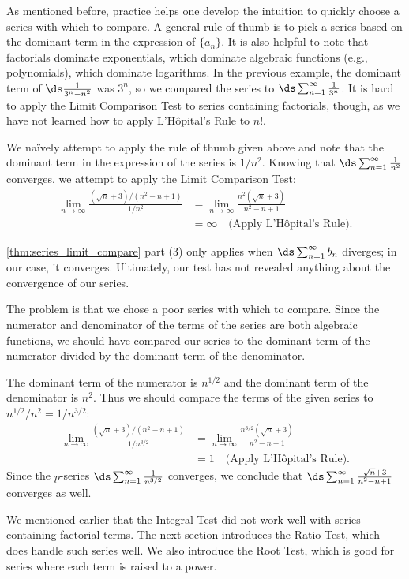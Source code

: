 As mentioned before, practice helps one develop the intuition to quickly choose a series with which to compare. A general rule of thumb is to pick a series based on the dominant term in the expression of $\{a_n\}$. It is also helpful to note that factorials dominate exponentials, which dominate algebraic functions (e.g., polynomials), which dominate logarithms. In the previous example, the dominant term of $\ds\frac{1}{3^n-n^2}$ was $3^n$, so we compared the series to $\ds \sum_{n=1}^\infty \frac1{3^n}$. It is hard to apply the Limit Comparison Test to series containing factorials, though, as we have not learned how to apply L'H\^opital's Rule to $n!$.

{We na\"ively attempt to apply the rule of thumb given above and note that the dominant term in the expression of the series is $1/n^2$. Knowing that $\ds \sum_{n=1}^\infty \frac1{n^2}$ converges, we attempt to apply the Limit Comparison Test:
\begin{align*}
\lim_{n\to\infty}\frac{(\sqrt{n}+3)/(n^2-n+1)}{1/n^2} &= \lim_{n\to\infty}\frac{n^2(\sqrt n+3)}{n^2-n+1}\\
		&= \infty \quad \text{(Apply L'H\^opital's Rule)}.
\end{align*}

\autoref{thm:series_limit_compare} part (3) only applies when $\ds\sum_{n=1}^\infty b_n$ diverges; in our case, it converges. Ultimately, our test has not revealed anything about the convergence of our series.

The problem is that we chose a poor series with which to compare. Since the numerator and denominator of the terms of the series are both algebraic functions, we should have compared our series  to the dominant term of the numerator divided by the dominant term of the denominator.

The dominant term of the numerator is $n^{1/2}$ and the dominant term of the denominator is $n^2$. Thus we should compare the terms of the given series to $n^{1/2}/n^2 = 1/n^{3/2}$:
\begin{align*}
\lim_{n\to\infty}\frac{(\sqrt{n}+3)/(n^2-n+1)}{1/n^{3/2}} &= \lim_{n\to \infty} \frac{n^{3/2}(\sqrt n+3)}{n^2-n+1} \\
		&= 1\quad \text{(Apply L'H\^opital's Rule)}.
\end{align*}
Since the  $p$-series $\ds\sum_{n=1}^\infty \frac1{n^{3/2}}$ converges, we conclude that $\ds\sum_{n=1}^\infty \frac{\sqrt{n}+3}{n^2-n+1}$ converges as well.}

We mentioned earlier that the Integral Test did not work well with series containing factorial terms. The next section introduces the Ratio Test, which does handle such series well. We also introduce the Root Test, which is good for series where each term is raised to a power.

